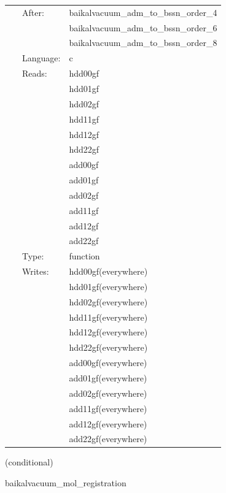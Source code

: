  \begin{tabular*}{160mm}{cll} 
~ & After:  & baikalvacuum\_adm\_to\_bssn\_order\_4 \\ 
~& ~ &baikalvacuum\_adm\_to\_bssn\_order\_6\\ 
~& ~ &baikalvacuum\_adm\_to\_bssn\_order\_8\\ 
~ & Language:  & c \\ 
~ & Reads:  & hdd00gf \\ 
~& ~ &hdd01gf\\ 
~& ~ &hdd02gf\\ 
~& ~ &hdd11gf\\ 
~& ~ &hdd12gf\\ 
~& ~ &hdd22gf\\ 
~& ~ &add00gf\\ 
~& ~ &add01gf\\ 
~& ~ &add02gf\\ 
~& ~ &add11gf\\ 
~& ~ &add12gf\\ 
~& ~ &add22gf\\ 
~ & Type:  & function \\ 
~ & Writes:  & hdd00gf(everywhere) \\ 
~& ~ &hdd01gf(everywhere)\\ 
~& ~ &hdd02gf(everywhere)\\ 
~& ~ &hdd11gf(everywhere)\\ 
~& ~ &hdd12gf(everywhere)\\ 
~& ~ &hdd22gf(everywhere)\\ 
~& ~ &add00gf(everywhere)\\ 
~& ~ &add01gf(everywhere)\\ 
~& ~ &add02gf(everywhere)\\ 
~& ~ &add11gf(everywhere)\\ 
~& ~ &add12gf(everywhere)\\ 
~& ~ &add22gf(everywhere)\\ 
\end{tabular*} 


\vspace{5mm}

   (conditional) 

\hspace{5mm} baikalvacuum\_mol\_registration 

\hspace{5mm}{\it register variables for mol } 


\hspace{5mm}


